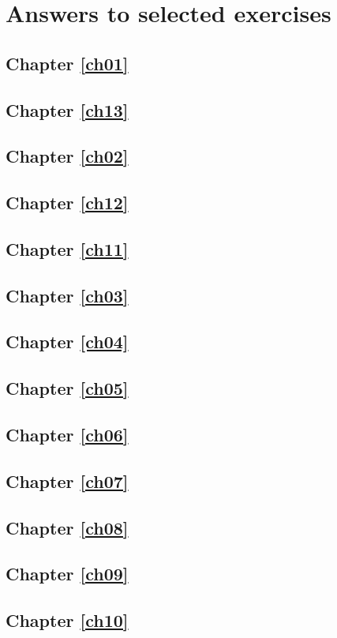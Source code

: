 \chapter{Answers to selected exercises}\label{appB}

\section*{Chapter \ref{ch01}}
\section*{Chapter \ref{ch13}}
\section*{Chapter \ref{ch02}}
\section*{Chapter \ref{ch12}}
\section*{Chapter \ref{ch11}}
\section*{Chapter \ref{ch03}}
\section*{Chapter \ref{ch04}}
\section*{Chapter \ref{ch05}}
\section*{Chapter \ref{ch06}}
\section*{Chapter \ref{ch07}}
\section*{Chapter \ref{ch08}}
\section*{Chapter \ref{ch09}}
\section*{Chapter \ref{ch10}}
